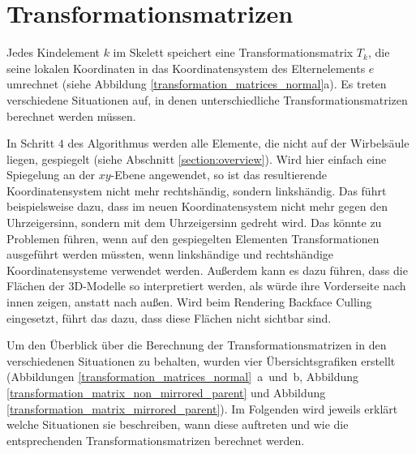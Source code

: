 \section{Transformationsmatrizen}
\label{implementation_detail_matrices}

Jedes Kindelement $k$ im Skelett speichert eine Transformationsmatrix $T_k$, die seine lokalen Koordinaten in das Koordinatensystem des Elternelements $e$ umrechnet (siehe Abbildung \ref{transformation_matrices_normal}a).
Es treten verschiedene Situationen auf, in denen unterschiedliche Transformationsmatrizen berechnet werden müssen.

In Schritt $4$ des Algorithmus werden \zb alle Elemente, die nicht auf der Wirbelsäule liegen, gespiegelt (siehe Abschnitt \ref{section:overview}). Wird hier einfach eine Spiegelung an der $xy$-Ebene angewendet, so ist das resultierende Koordinatensystem nicht mehr rechtshändig, sondern linkshändig.
Das führt beispielsweise dazu, dass im neuen Koordinatensystem nicht mehr gegen den Uhrzeigersinn, sondern mit dem Uhrzeigersinn gedreht wird. Das könnte zu Problemen führen, wenn auf den gespiegelten Elementen Transformationen ausgeführt werden müssten, \va wenn linkshändige und rechtshändige Koordinatensysteme verwendet werden. Außerdem kann es dazu führen, dass die Flächen der 3D-Modelle so interpretiert werden, als würde ihre Vorderseite nach innen zeigen, anstatt nach außen. Wird beim Rendering Backface Culling \cite{backfaceCulling} eingesetzt, führt das dazu, dass diese Flächen nicht sichtbar sind.

Um den Überblick über die Berechnung der Transformationsmatrizen in den verschiedenen Situationen zu behalten, wurden vier Übersichtsgrafiken erstellt (Abbildungen \mbox{\ref{transformation_matrices_normal} a und b}, Abbildung \ref{transformation_matrix_non_mirrored_parent} und Abbildung \ref{transformation_matrix_mirrored_parent}). 
Im Folgenden wird jeweils erklärt welche Situationen sie beschreiben, wann diese auftreten und wie die entsprechenden Transformationsmatrizen berechnet werden.

